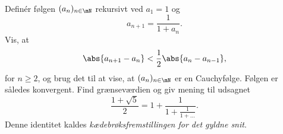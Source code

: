 \begin{opg}\hfill \\
Definér følgen $(a_n)_{n\in\mN}$ rekursivt ved $a_1 = 1$ og 
$$ a_{n+1} = \frac{1}{1 + a_n}. $$
Vis, at
$$ \abs{a_{n+1} - a_n} < \frac{1}{2}\abs{a_n - a_{n-1}}, $$
for $n \geq 2$, og brug det til at vise, at $(a_n)_{n\in\mN}$ er en Cauchyfølge. Følgen er således konvergent. Find grænseværdien og giv mening til udsagnet
$$ \frac{1 + \sqrt{5}}{2} = 1 + \frac{1}{1 + \frac{1}{1 + \dots}}. $$
Denne identitet kaldes \emph{kædebrøksfremstillingen for det gyldne snit}.
\end{opg}

